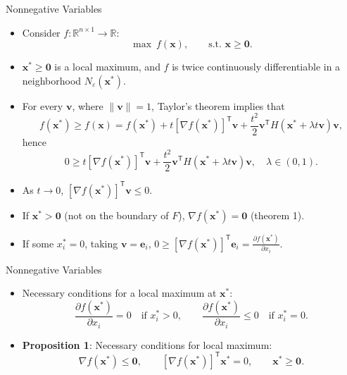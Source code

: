 \documentclass[aspectratio=169,hyperref,UTF8,CJK]{beamer}
\newcommand{\R}{\mathbb{R}}
\newcommand{\trans}{\mathsf{T}}
\newcommand{\vect}[1]{\boldsymbol{#1}}
\begin{document}
\begin{frame}{Nonnegative Variables}
  \scriptsize
  \begin{itemize}
    \item Consider $f:\R^{n\times1}\to\R$:
      \begin{equation*}
        \max\ f(\vect{x}),\qquad\text{s.t. }\vect{x}\ge\vect{0}.
      \end{equation*}
    \item $\vect{x}^{*}\ge\vect{0}$ is a local maximum, and $f$ is twice continuously differentiable in a neighborhood $N_{\varepsilon}(\vect{x}^{*})$.
    \item For every $\vect{v}$, where $\|\vect{v}\|=1$, Taylor's theorem implies that
      \begin{equation*}
        f(\vect{x}^{*})\ge f(\vect{x})=f(\vect{x}^{*})+
        t[\nabla f(\vect{x}^{*})]^{\trans}\vect{v}+
        \frac{t^2}{2}\vect{v}^{\trans}H(\vect{x}^{*}+\lambda t\vect{v})\vect{v},
      \end{equation*}
      hence
      \begin{equation*}
        0\ge t[\nabla f(\vect{x}^{*})]^{\trans}\vect{v}+
        \frac{t^2}{2}\vect{v}^{\trans}H(\vect{x}^{*}+\lambda t\vect{v})\vect{v},
        \quad\lambda\in(0,1).
      \end{equation*}
    \item As $t\to0$, $[\nabla f(\vect{x}^{*})]^{\trans}\vect{v}\le0$.
    \item If $\vect{x}^{*}>\vect{0}$ (not on the boundary of $F$), $\nabla f(\vect{x}^{*})=\vect{0}$ (theorem 1).
    \item If some $x_i^{*}=0$, taking $\vect{v}=\vect{e}_i$,
      $0\ge[\nabla f(\vect{x}^{*})]^{\trans}\vect{e}_i=\frac{\partial f(\vect{x}^{*})}{\partial x_i}$.
  \end{itemize}
\end{frame}

\begin{frame}{Nonnegative Variables}
  \begin{itemize}
    \item Necessary conditions for a local maximum at $\vect{x}^{*}$:
      \begin{equation*}
        \frac{\partial f(\vect{x}^{*})}{\partial x_i}=0\quad\text{if }x_i^{*}>0,
        \qquad
        \frac{\partial f(\vect{x}^{*})}{\partial x_i}\le0\quad\text{if }x_i^{*}=0.
      \end{equation*}
    \item \textbf{Proposition 1}: Necessary conditions for local maximum:
      \begin{equation*}
        \nabla f(\vect{x}^{*})\le\vect{0},\qquad
        [\nabla f(\vect{x}^{*})]^{\trans}\vect{x}^{*}=0,
        \qquad\vect{x}^{*}\ge\vect{0}.
      \end{equation*}
  \end{itemize}
\end{frame}
\end{document}

